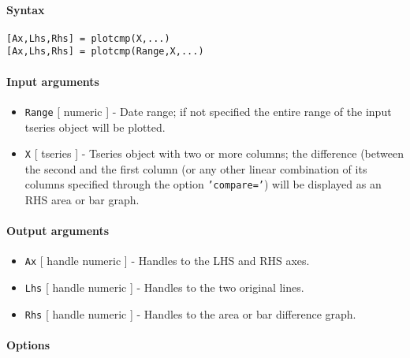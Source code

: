 


	\paragraph{Syntax}

\begin{verbatim}
[Ax,Lhs,Rhs] = plotcmp(X,...)
[Ax,Lhs,Rhs] = plotcmp(Range,X,...)
\end{verbatim}

\paragraph{Input arguments}

\begin{itemize}
\item
  \texttt{Range} {[} numeric {]} - Date range; if not specified the
  entire range of the input tseries object will be plotted.
\item
  \texttt{X} {[} tseries {]} - Tseries object with two or more columns;
  the difference (between the second and the first column (or any other
  linear combination of its columns specified through the option
  \texttt{'compare='}) will be displayed as an RHS area or bar graph.
\end{itemize}

\paragraph{Output arguments}

\begin{itemize}
\item
  \texttt{Ax} {[} handle \textbar{} numeric {]} - Handles to the LHS and
  RHS axes.
\item
  \texttt{Lhs} {[} handle \textbar{} numeric {]} - Handles to the two
  original lines.
\item
  \texttt{Rhs} {[} handle \textbar{} numeric {]} - Handles to the area
  or bar difference graph.
\end{itemize}

\paragraph{Options}


